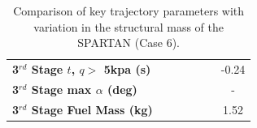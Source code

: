 \begin{table}[ht]
\begin{tabular}{l c c c c c c}
		\textbf{3$^{rd}$ Stage $t$, $q >$ 5kpa (s)}
		& \thirdqOverFivemSPARTANNinetyFiveNoReturn
		& \thirdqOverFivemSPARTANNinetySevenFiveNoReturn
		& \thirdqOverFivemSPARTANStandardNoReturn
		& \thirdqOverFivemSPARTANOneHundredTwoFiveNoReturn
		& \thirdqOverFivemSPARTANOneHundredFiveNoReturn
		&-0.24
		\\
		\textbf{3$^{rd}$ Stage max $\alpha$ (deg)}
		& \thirdmaxAoAmSPARTANNinetyFiveNoReturn
		& \thirdmaxAoAmSPARTANNinetySevenFiveNoReturn
		& \thirdmaxAoAmSPARTANStandardNoReturn
		& \thirdmaxAoAmSPARTANOneHundredTwoFiveNoReturn
		& \thirdmaxAoAmSPARTANOneHundredFiveNoReturn
		& -
		\\
		\textbf{3$^{rd}$ Stage Fuel Mass (kg)}
		& \thirdmFuelmSPARTANNinetyFiveNoReturn
		& \thirdmFuelmSPARTANNinetySevenFiveNoReturn
		& \thirdmFuelmSPARTANStandardNoReturn
		& \thirdmFuelmSPARTANOneHundredTwoFiveNoReturn
		& \thirdmFuelmSPARTANOneHundredFiveNoReturn
		&1.52
		\\
		\hline 
	\end{tabular}  
\caption{Comparison of key trajectory parameters with variation in the structural mass of the SPARTAN (Case 6).}
\label{tab:comparison100}
	
\end{table}


